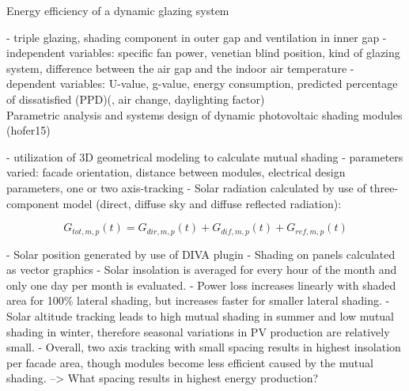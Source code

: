 Energy efficiency of a dynamic glazing system \cite{lollini10}

	- triple glazing, shading component in outer gap and ventilation in inner gap
	- independent variables: specific fan power, venetian blind position, kind of glazing system, difference between the air gap and the indoor air temperature
	- dependent variables: U-value, g-value, energy consumption, predicted percentage of dissatisfied (PPD)(, air change, daylighting factor)\\

Parametric analysis and systems design of dynamic photovoltaic shading modules (hofer15)

	- utilization of 3D geometrical modeling to calculate mutual shading
	- parameters varied: facade orientation, distance between modules, electrical design parameters, one or two axis-tracking
	- Solar radiation calculated by use of three-component model (direct, diffuse sky and diffuse reflected radiation):

	\begin{equation}
		G_{tot,m,p}(t) = G_{dir,m,p}(t) +G_{dif,m,p}(t) + G_{ref,m,p}(t)
		\label{e:radiation}
	\end{equation}

	- Solar position generated by use of DIVA plugin
	- Shading on panels calculated as vector graphics
	- Solar insolation is averaged for every hour of the month and only one day per month is evaluated.
	- Power loss increases linearly with shaded area for 100\% lateral shading, but increases faster for smaller lateral shading. 
	- Solar altitude tracking leads to high mutual shading in summer and low mutual shading in winter, therefore seasonal variations in PV production are relatively small.
	- Overall, two axis tracking with small spacing results in highest insolation per facade area, though modules become less efficient caused by the mutual shading. --> What spacing results in highest energy production?






	
	
	
	

